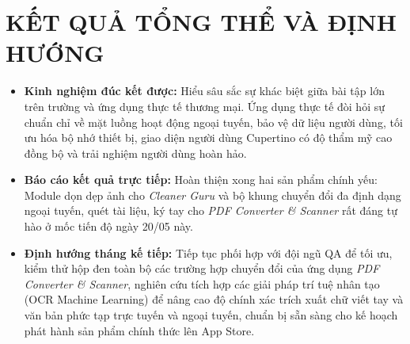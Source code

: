 \documentclass[12pt, a4paper]{article}
\begin{document}
\section{KẾT QUẢ TỔNG THỂ VÀ ĐỊNH HƯỚNG}
\begin{itemize}
    \item \textbf{Kinh nghiệm đúc kết được:} Hiểu sâu sắc sự khác biệt giữa bài tập lớn trên trường và ứng dụng thực tế thương mại. Ứng dụng thực tế đòi hỏi sự chuẩn chỉ về mặt luồng hoạt động ngoại tuyến, bảo vệ dữ liệu người dùng, tối ưu hóa bộ nhớ thiết bị, giao diện người dùng Cupertino có độ thẩm mỹ cao đồng bộ và trải nghiệm người dùng hoàn hảo.
    \item \textbf{Báo cáo kết quả trực tiếp:} Hoàn thiện xong hai sản phẩm chính yếu: Module dọn dẹp ảnh cho \textit{Cleaner Guru} và bộ khung chuyển đổi đa định dạng ngoại tuyến, quét tài liệu, ký tay cho \textit{PDF Converter \& Scanner} rất đáng tự hào ở mốc tiến độ ngày 20/05 này.
    \item \textbf{Định hướng tháng kế tiếp:} Tiếp tục phối hợp với đội ngũ QA để tối ưu, kiểm thử hộp đen toàn bộ các trường hợp chuyển đổi của ứng dụng \textit{PDF Converter \& Scanner}, nghiên cứu tích hợp các giải pháp trí tuệ nhân tạo (OCR Machine Learning) để nâng cao độ chính xác trích xuất chữ viết tay và văn bản phức tạp trực tuyến và ngoại tuyến, chuẩn bị sẵn sàng cho kế hoạch phát hành sản phẩm chính thức lên App Store.
\end{itemize}
\end{document}

